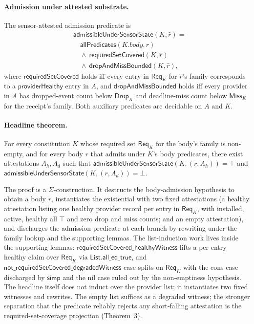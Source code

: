\paragraph{Admission under attested substrate.}
The sensor-attested admission predicate is
\[
\begin{aligned}
  &\mathsf{admissibleUnderSensorState}(K, \hat r) = \\
   &\quad \mathsf{allPredicates}(K.\mathit{body}, r) \\
   &\quad \wedge\ \mathsf{requiredSetCovered}(K, \hat r) \\
   &\quad \wedge\ \mathsf{dropAndMissBounded}(K, \hat r),
\end{aligned}
\]
where $\mathsf{requiredSetCovered}$ holds iff every entry in $\mathsf{Req}_K$ for $\hat r$'s family corresponds to a $\mathsf{providerHealthy}$ entry in $A$, and $\mathsf{dropAndMissBounded}$ holds iff every provider in $A$ has dropped-event count below $\mathsf{Drop}_K$ and deadline-miss count below $\mathsf{Miss}_K$ for the receipt's family. Both auxiliary predicates are decidable on $A$ and $K$.

\paragraph{Headline theorem.}
For every constitution $K$ whose required set $\mathsf{Req}_K$ for the body's family is non-empty, and for every body $r$ that admits under $K$'s body predicates, there exist attestations $A_h, A_d$ such that
$\mathsf{admissibleUnderSensorState}(K, (r, A_h)) = \top$
and
$\mathsf{admissibleUnderSensorState}(K, (r, A_d)) = \bot$.

The proof is a $\Sigma$-construction. It destructs the body-admission hypothesis to obtain a body $r$, instantiates the existential with two fixed attestations (a healthy attestation listing one healthy provider record per entry in $\mathsf{Req}_K$, with installed, active, healthy all $\top$ and zero drop and miss counts; and an empty attestation), and discharges the admission predicate at each branch by rewriting under the family lookup and the supporting lemmas. The list-induction work lives inside the supporting lemmas: $\mathsf{requiredSetCovered\_healthyWitness}$ lifts a per-entry healthy claim over $\mathsf{Req}_K$ via $\mathsf{List.all\_eq\_true}$, and $\mathsf{not\_requiredSetCovered\_degradedWitness}$ case-splits on $\mathsf{Req}_K$ with the cons case discharged by $\mathsf{simp}$ and the nil case ruled out by the non-emptiness hypothesis. The headline itself does not induct over the provider list; it instantiates two fixed witnesses and rewrites. The empty list suffices as a degraded witness; the stronger separation that the predicate reliably rejects any short-falling attestation is the required-set-coverage projection (Theorem~3).

